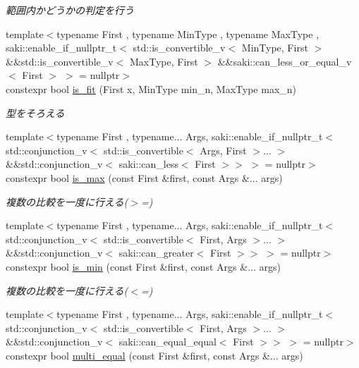 \begin{DoxyCompactItemize}
\begin{DoxyCompactList}\small\item\em 範囲内かどうかの判定を行う \end{DoxyCompactList}\item 
{\footnotesize template$<$typename First , typename Min\+Type , typename Max\+Type , saki\+::enable\+\_\+if\+\_\+nullptr\+\_\+t$<$ std\+::is\+\_\+convertible\+\_\+v$<$ Min\+Type, First $>$ \&\&std\+::is\+\_\+convertible\+\_\+v$<$ Max\+Type, First $>$ \&\&saki\+::can\+\_\+less\+\_\+or\+\_\+equal\+\_\+v$<$ First $>$ $>$  = nullptr$>$ }\\constexpr bool \mbox{\hyperlink{namespacesaki_a09478d8cb01d75e93d34f884d7133dc9}{is\+\_\+fit}} (First x, Min\+Type min\+\_\+n, Max\+Type max\+\_\+n)
\begin{DoxyCompactList}\small\item\em 型をそろえる \end{DoxyCompactList}\item 
{\footnotesize template$<$typename First , typename... Args, saki\+::enable\+\_\+if\+\_\+nullptr\+\_\+t$<$ std\+::conjunction\+\_\+v$<$ std\+::is\+\_\+convertible$<$ Args, First $>$... $>$ \&\&std\+::conjunction\+\_\+v$<$ saki\+::can\+\_\+less$<$ First $>$$>$ $>$  = nullptr$>$ }\\constexpr bool \mbox{\hyperlink{namespacesaki_af73b5897b021844313675413b6c8aac2}{is\+\_\+max}} (const First \&first, const Args \&... args)
\begin{DoxyCompactList}\small\item\em 複数の比較を一度に行える($>$=) \end{DoxyCompactList}\item 
{\footnotesize template$<$typename First , typename... Args, saki\+::enable\+\_\+if\+\_\+nullptr\+\_\+t$<$ std\+::conjunction\+\_\+v$<$ std\+::is\+\_\+convertible$<$ First, Args $>$... $>$ \&\&std\+::conjunction\+\_\+v$<$ saki\+::can\+\_\+greater$<$ First $>$$>$ $>$  = nullptr$>$ }\\constexpr bool \mbox{\hyperlink{namespacesaki_a761604ec865e518ea0ba335b709be060}{is\+\_\+min}} (const First \&first, const Args \&... args)
\begin{DoxyCompactList}\small\item\em 複数の比較を一度に行える($<$=) \end{DoxyCompactList}\item 
{\footnotesize template$<$typename First , typename... Args, saki\+::enable\+\_\+if\+\_\+nullptr\+\_\+t$<$ std\+::conjunction\+\_\+v$<$ std\+::is\+\_\+convertible$<$ First, Args $>$... $>$ \&\&std\+::conjunction\+\_\+v$<$ saki\+::can\+\_\+equal\+\_\+equal$<$ First $>$$>$ $>$  = nullptr$>$ }\\constexpr bool \mbox{\hyperlink{namespacesaki_a098cd355949dd93ffdaf620f0fc7e236}{multi\+\_\+equal}} (const First \&first, const Args \&... args)

\end{DoxyCompactItemize}
